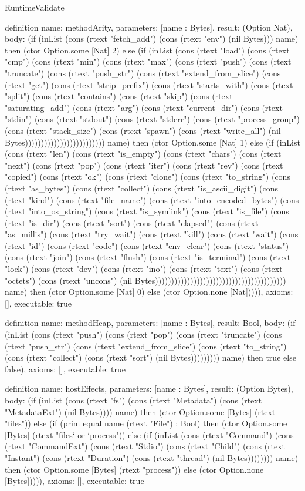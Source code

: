 \begin{lexlean}{RuntimeValidate}
\begin{semanticmodule}
definition{
  name: methodArity,
  parameters: [name : Bytes],
  result: (Option Nat),
  body: (if (inList (cons (rtext "fetch_add") (cons (rtext "env") (nil Bytes))) name) then (ctor Option.some [Nat] 2) else (if (inList (cons (rtext "load") (cons (rtext "cmp") (cons (rtext "min") (cons (rtext "max") (cons (rtext "push") (cons (rtext "truncate") (cons (rtext "push_str") (cons (rtext "extend_from_slice") (cons (rtext "get") (cons (rtext "strip_prefix") (cons (rtext "starts_with") (cons (rtext "split") (cons (rtext "contains") (cons (rtext "skip") (cons (rtext "saturating_add") (cons (rtext "arg") (cons (rtext "current_dir") (cons (rtext "stdin") (cons (rtext "stdout") (cons (rtext "stderr") (cons (rtext "process_group") (cons (rtext "stack_size") (cons (rtext "spawn") (cons (rtext "write_all") (nil Bytes))))))))))))))))))))))))) name) then (ctor Option.some [Nat] 1) else (if (inList (cons (rtext "len") (cons (rtext "is_empty") (cons (rtext "chars") (cons (rtext "next") (cons (rtext "pop") (cons (rtext "iter") (cons (rtext "rev") (cons (rtext "copied") (cons (rtext "ok") (cons (rtext "clone") (cons (rtext "to_string") (cons (rtext "as_bytes") (cons (rtext "collect") (cons (rtext "is_ascii_digit") (cons (rtext "kind") (cons (rtext "file_name") (cons (rtext "into_encoded_bytes") (cons (rtext "into_os_string") (cons (rtext "is_symlink") (cons (rtext "is_file") (cons (rtext "is_dir") (cons (rtext "sort") (cons (rtext "elapsed") (cons (rtext "as_millis") (cons (rtext "try_wait") (cons (rtext "kill") (cons (rtext "wait") (cons (rtext "id") (cons (rtext "code") (cons (rtext "env_clear") (cons (rtext "status") (cons (rtext "join") (cons (rtext "flush") (cons (rtext "is_terminal") (cons (rtext "lock") (cons (rtext "dev") (cons (rtext "ino") (cons (rtext "text") (cons (rtext "octets") (cons (rtext "uncons") (nil Bytes))))))))))))))))))))))))))))))))))))))))) name) then (ctor Option.some [Nat] 0) else (ctor Option.none [Nat])))),
  axioms: [],
  executable: true
}

definition{
  name: methodHeap,
  parameters: [name : Bytes],
  result: Bool,
  body: (if (inList (cons (rtext "push") (cons (rtext "pop") (cons (rtext "truncate") (cons (rtext "push_str") (cons (rtext "extend_from_slice") (cons (rtext "to_string") (cons (rtext "collect") (cons (rtext "sort") (nil Bytes))))))))) name) then true else false),
  axioms: [],
  executable: true
}

definition{
  name: hostEffects,
  parameters: [name : Bytes],
  result: (Option Bytes),
  body: (if (inList (cons (rtext "fs") (cons (rtext "Metadata") (cons (rtext "MetadataExt") (nil Bytes)))) name) then (ctor Option.some [Bytes] (rtext "files")) else (if (prim equal name (rtext "File") : Bool) then (ctor Option.some [Bytes] (rtext "files` or `process")) else (if (inList (cons (rtext "Command") (cons (rtext "CommandExt") (cons (rtext "Stdio") (cons (rtext "Child") (cons (rtext "Instant") (cons (rtext "Duration") (cons (rtext "thread") (nil Bytes)))))))) name) then (ctor Option.some [Bytes] (rtext "process")) else (ctor Option.none [Bytes])))),
  axioms: [],
  executable: true
}


\end{semanticmodule}
\end{lexlean}
